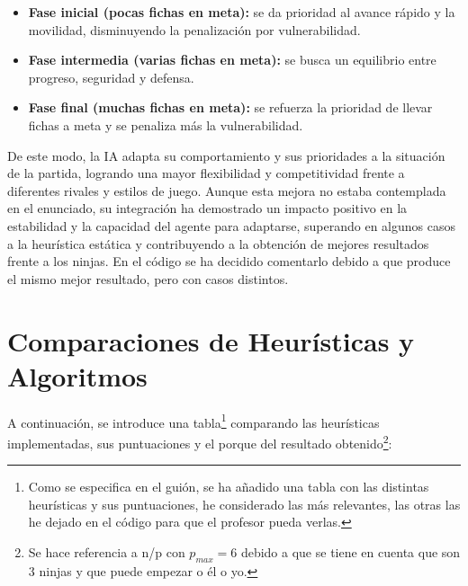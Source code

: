 \begin{itemize}
    \item \textbf{Fase inicial (pocas fichas en meta):} se da prioridad al avance rápido y la movilidad, disminuyendo la penalización por vulnerabilidad.
    \item \textbf{Fase intermedia (varias fichas en meta):} se busca un equilibrio entre progreso, seguridad y defensa.
    \item \textbf{Fase final (muchas fichas en meta):} se refuerza la prioridad de llevar fichas a meta y se penaliza más la vulnerabilidad.
\end{itemize}

De este modo, la IA adapta su comportamiento y sus prioridades a la situación de la partida, logrando una mayor flexibilidad y competitividad frente a diferentes rivales y estilos de juego. Aunque esta mejora no estaba contemplada en el enunciado, su integración ha demostrado un impacto positivo en la estabilidad y la capacidad del agente para adaptarse, superando en algunos casos a la heurística estática y contribuyendo a la obtención de mejores resultados frente a los ninjas. En el código se ha decidido comentarlo debido a que produce el mismo mejor resultado, pero con casos distintos.


\chapter*{Comparaciones de Heurísticas y Algoritmos}

A continuación, se introduce una tabla\footnote{Como se especifica en el guión, se ha añadido una tabla con las distintas heurísticas y sus puntuaciones, he considerado las más relevantes, las otras las he dejado en el código para que el profesor pueda verlas.} comparando las heurísticas implementadas, sus puntuaciones y el porque del resultado obtenido\footnote{Se hace referencia a n/p con $p_{max} = 6$ debido a que se tiene en cuenta que son 3 ninjas y que puede empezar o él o yo. }:



